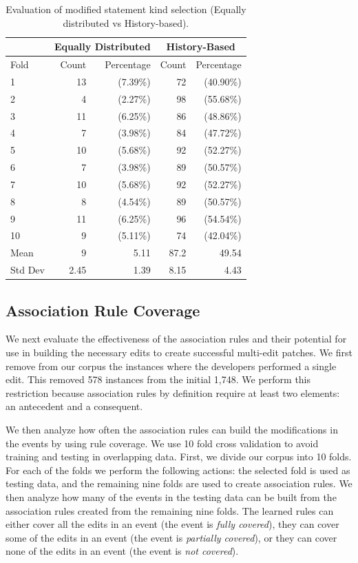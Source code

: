 \documentclass[sigconf]{acmart}
\begin{document}
\begin{table}[]
\centering
\caption{Evaluation of modified statement kind selection (Equally distributed vs History-based).}
\label{10FoldEDvsHB}
\begin{tabular}{l|rr|rr}
\toprule
   &   \multicolumn{2}{c|}{ Equally Distributed}   &   \multicolumn{2}{|c}{ History-Based} \\
\midrule
Fold  &   Count & Percentage  &  Count & Percentage  \\
\midrule
1&13&(7.39\%) & 72&(40.90\%) \\
2&4&(2.27\%) & 98&(55.68\%) \\
3&11&(6.25\%) & 86&(48.86\%) \\
4&7&(3.98\%) & 84&(47.72\%) \\
5&10&(5.68\%) & 92&(52.27\%) \\
6&7&(3.98\%) & 89&(50.57\%) \\
7&10&(5.68\%) & 92&(52.27\%) \\
8&8&(4.54\%) & 89&(50.57\%) \\
9&11&(6.25\%) & 96&(54.54\%) \\
10&9&(5.11\%) & 74&(42.04\%) \\
\bottomrule
Mean &9 & 5.11 & 87.2 & 49.54 \\
\bottomrule
Std Dev & 2.45 & 1.39 & 8.15 & 4.43 \\
\bottomrule

\end{tabular}
\end{table}



\subsection{Association Rule Coverage}

We next evaluate the effectiveness
of the association rules and their potential for use in building the
necessary edits to create successful multi-edit patches. We first
remove from our corpus the instances where the developers
performed a single edit. This removed 578 instances from the initial 1,748.
We perform this restriction because association rules
by definition require at least two elements: an antecedent
and a consequent. 

We then analyze how often the association rules can build the 
modifications in the events by using rule coverage. We use 10 fold cross validation to avoid training and testing in overlapping data.
First, we divide our corpus into 10 folds.
For each of the folds we perform the following actions:
the selected fold is used as testing data, and the
remaining nine folds are used to create association rules.
We then analyze how many of the events in the testing data
can be built from the association 
rules created from the remaining nine folds.
The learned rules can either cover all the edits in an event (the 
event is \emph{fully covered}), they can cover some of the edits in an 
event (the event is \emph{partially covered}), or they can cover none of
the edits in an event (the event is \emph{not covered}).
\end{document}
